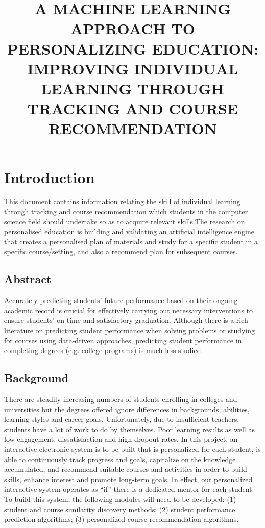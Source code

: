 \documentclass{article}
\begin{document}
\title{A MACHINE LEARNING APPROACH TO PERSONALIZING EDUCATION: IMPROVING INDIVIDUAL LEARNING THROUGH TRACKING AND COURSE RECOMMENDATION}
\author{}
\maketitle

\section{Introduction}
This document contains information relating the skill of individual learning through tracking and course recommendation which students in the computer science field should undertake so as to acquire relevant skills.The research on personalised education is building and validating an artificial intelligence engine that creates a personalised plan of materials and study for a specific student in a specific course/setting, and also a recommend plan for subsequent courses.
\subsection{Abstract}
Accurately predicting students’ future performance based on their ongoing academic record is crucial for effectively carrying out necessary interventions to ensure students’
on-time and satisfactory graduation. Although there is a rich literature on predicting student performance when solving problems or studying for courses using data-driven approaches,
predicting student performance in completing degrees (e.g. college programs) is much less studied.

\subsection{Background}
There are steadily increasing numbers of students enrolling in colleges and universities but the degrees offered ignore differences in backgrounds, abilities, learning styles and career goals. Unfortunately, due to insufficient teachers, students have a lot of work to  do by themselves. Poor learning results as well as low engagement, dissatisfaction and high dropout rates. In this project, an interactive electronic system is to be built that is personalized for each student, is able to continuously track progress and goals, capitalize on the knowledge accumulated, and recommend suitable courses and activities in order to build skills, enhance interest and promote  long-term goals. In effect, our personalized interactive system operates as “if” there is a dedicated mentor for each student. To build this system, the following modules will need to be developed: (1) student and course similarity discovery methods; (2) student performance prediction algorithms; (3) personalized course recommendation algorithms.
\end{document}
